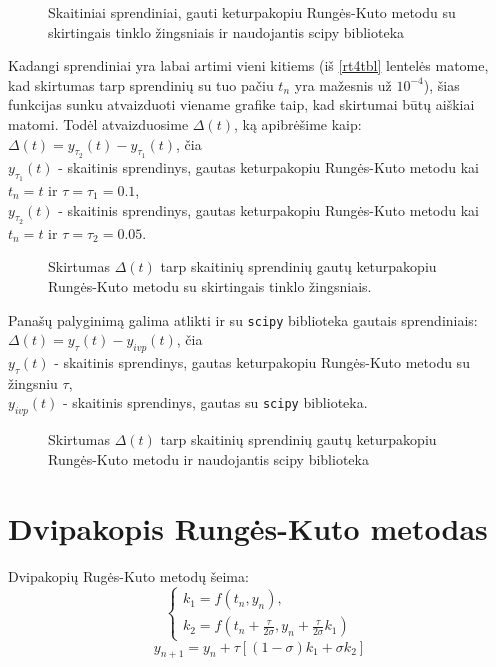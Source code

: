 \documentclass[]{VUMIFTemplateClass}
\newcommand{\tone}{0.1}
\newcommand{\ttwo}{0.05}
\begin{document}
\begin{figure}[H]
    \begin{center}
        
    \end{center}
    \caption{Skaitiniai sprendiniai, gauti keturpakopiu Rungės-Kuto metodu su skirtingais tinklo žingsniais ir naudojantis scipy biblioteka}
\end{figure}

Kadangi sprendiniai yra labai artimi vieni kitiems (iš \ref{rt4tbl} lentelės matome, kad skirtumas tarp sprendinių su tuo pačiu $t_n$ yra mažesnis už $10^{-4}$), šias funkcijas sunku atvaizduoti viename grafike taip, kad skirtumai būtų aiškiai matomi. Todėl atvaizduosime $\Delta(t)$, ką apibrėšime kaip:\\
$\Delta(t) = y_{\tau_2}(t) - y_{\tau_1}(t)$, čia\\
$y_{\tau_1}(t)$ - skaitinis sprendinys, gautas keturpakopiu Rungės-Kuto metodu kai $t_n = t$ ir $\tau = \tau_1 = \tone$,\\
$y_{\tau_2}(t)$ - skaitinis sprendinys, gautas keturpakopiu Rungės-Kuto metodu kai $t_n = t$ ir $\tau = \tau_2 = \ttwo$.

\begin{figure}[H]
    \begin{center}
        
    \end{center}
    \caption{Skirtumas $\Delta(t)$ tarp skaitinių sprendinių gautų keturpakopiu Rungės-Kuto metodu su skirtingais tinklo žingsniais.}
\end{figure}

Panašų palyginimą galima atlikti ir su \texttt{scipy} biblioteka gautais sprendiniais:\\
$\Delta(t) = y_{\tau}(t) - y_{ivp}(t)$, čia\\
$y_{\tau}(t)$ - skaitinis sprendinys, gautas keturpakopiu Rungės-Kuto metodu su žingsniu $\tau$,\\
$y_{ivp}(t)$ - skaitinis sprendinys, gautas su \texttt{scipy} biblioteka.
\begin{figure}[H]
    \begin{center}
        
    \end{center}
    \caption{Skirtumas $\Delta(t)$ tarp skaitinių sprendinių gautų keturpakopiu Rungės-Kuto metodu ir naudojantis scipy biblioteka}
\end{figure}

\section{Dvipakopis Rungės-Kuto metodas}
Dvipakopių Rugės-Kuto metodų šeima:
\begin{equation}
    \begin{cases}
        k_1 = f(t_n, y_n),\\
        k_2 = f(t_n + \frac{\tau}{2 \sigma}, y_n + \frac{\tau}{2 \sigma} k_1)
    \end{cases}
\end{equation}
\[ y_{n+1} = y_n + \tau [(1 - \sigma) k_1 + \sigma k_2]\]
\end{document}
